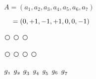 
\usepackage{pifont}




$A =(a_1,a_2,a_3,a_4,a_5,a_6,a_7)$

$\hspace{4.2mm}=(0,+1,-1,+1,0,0,-1)$

\vspace{.3cm}

{\Large \textcircled{ }} {\Large \textcircled{ }} {\Large \textcircled{ }}

\vspace{.2cm}

{\Large \textcircled{ }} {\Large \textcircled{ }} {\Large \textcircled{ }} {\Large \textcircled{ }}

\vspace{.2cm}

\normalsize $\mathnormal{g_1}$ \normalsize $\mathnormal{g_2}$ \normalsize $\mathnormal{g_3}$ \normalsize $\mathnormal{g_4}$ \normalsize $\mathnormal{g_5}$ \normalsize $\mathnormal{g_6}$ \normalsize $\mathnormal{g_7}$






